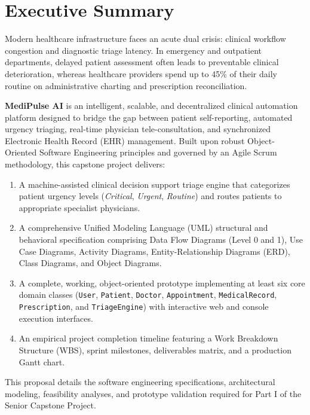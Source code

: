 \documentclass[11pt,a4paper]{article}
\begin{document}
\newpage
\tableofcontents
\newpage
\listoffigures
\listoftables
\newpage

\section*{Executive Summary}
Modern healthcare infrastructure faces an acute dual crisis: clinical workflow congestion and diagnostic triage latency. In emergency and outpatient departments, delayed patient assessment often leads to preventable clinical deterioration, whereas healthcare providers spend up to 45\% of their daily routine on administrative charting and prescription reconciliation. 

\textbf{MediPulse AI} is an intelligent, scalable, and decentralized clinical automation platform designed to bridge the gap between patient self-reporting, automated urgency triaging, real-time physician tele-consultation, and synchronized Electronic Health Record (EHR) management. Built upon robust Object-Oriented Software Engineering principles and governed by an Agile Scrum methodology, this capstone project delivers:
\begin{enumerate}
    \item A machine-assisted clinical decision support triage engine that categorizes patient urgency levels (\textit{Critical}, \textit{Urgent}, \textit{Routine}) and routes patients to appropriate specialist physicians.
    \item A comprehensive Unified Modeling Language (UML) structural and behavioral specification comprising Data Flow Diagrams (Level 0 and 1), Use Case Diagrams, Activity Diagrams, Entity-Relationship Diagrams (ERD), Class Diagrams, and Object Diagrams.
    \item A complete, working, object-oriented prototype implementing at least six core domain classes (\texttt{User}, \texttt{Patient}, \texttt{Doctor}, \texttt{Appointment}, \texttt{MedicalRecord}, \texttt{Prescription}, and \texttt{TriageEngine}) with interactive web and console execution interfaces.
    \item An empirical project completion timeline featuring a Work Breakdown Structure (WBS), sprint milestones, deliverables matrix, and a production Gantt chart.
\end{enumerate}
This proposal details the software engineering specifications, architectural modeling, feasibility analyses, and prototype validation required for Part I of the Senior Capstone Project.
\end{document}
